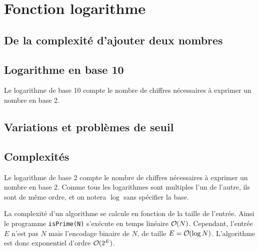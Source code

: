 
\chapter{Fonction logarithme}
\label{chap:log}

\section{De la complexité d'ajouter deux nombres}


\section{Logarithme en base 10}

Le logarithme de base 10 compte le nombre de chiffres nécessaires à exprimer un nombre en base 2.

\section{Variations et problèmes de seuil}


\section{Complexités}

Le logarithme de base 2 compte le nombre de chiffres nécessaires à exprimer un nombre en base 2.
Comme tous les logarithmes sont multiples l'un de l'autre, ils sont de même ordre, et on notera $\log$ sans spécifier la base.

La complexité d'un algorithme se calcule en fonction de la taille de l'entrée.
Ainsi le programme \texttt{isPrime(N)} s'exécute en temps linéaire $\O(N)$.
Cependant, l'entrée $E$ n'est pas $N$ mais l'encodage binaire de $N$, de taille $E = \O(\log N)$.
L'algorithme est donc exponentiel d'ordre $\O(2^E)$.

